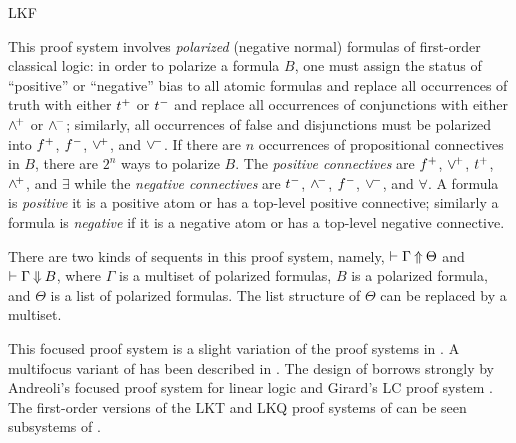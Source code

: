 \begin{entry}{LKF}
\begin{clarifications}
This proof system involves \emph{polarized} (negative normal) formulas
of first-order classical logic: in order to polarize a formula $B$,
one must assign the status of ``positive'' or ``negative'' bias to all
atomic formulas and replace all occurrences of truth with either
$t^+$ or $t^-$ and replace all occurrences of conjunctions with
either $\wedge^{\!+}$ or $\wedge^{\!-}$; similarly, all occurrences of false and
disjunctions must be polarized into $f^+$, $f^-$, $\vee^{\!+}$, and
$\vee^{\!-}$. If there are $n$ occurrences of propositional connectives
in $B$, there are $2^n$ ways to polarize $B$.
The \emph{positive connectives} are $f^+$, $\vee^{\!+}$, $t^+$,
$\wedge^{\!+}$, and $\exists$ while the \emph{negative connectives} are
$t^-$, $\wedge^{\!-}$, $f^-$, $\vee^{\!-}$, and $\forall$.
A formula is \emph{positive} it is a positive atom or has a top-level
positive connective; similarly a formula is \emph{negative} if it is a
negative atom or has a top-level negative connective.

There are two kinds of sequents in this proof system, namely,
$\vdash\Gamma\mathbin{\Uparrow} \Theta$ and $\vdash\Gamma\mathbin{\Downarrow} B$, where $\Gamma$ is a
multiset of polarized formulas, $B$ is a polarized formula, and
$\Theta$ is a list of polarized formulas.  The list structure of
$\Theta$ can be replaced by a multiset.
\end{clarifications}

\begin{history}
This focused proof system is a slight variation of the proof systems in
\cite{liang09tcs,liang07csl}.  
A multifocus variant of \LKF has been described in \cite{chaudhuri14jlc}.
The design of \LKF borrows strongly by Andreoli's focused proof system for
linear logic \cite{andreoli92jlc} and Girard's LC proof
system \cite{girard91mscs}.  The first-order versions 
of the LKT and LKQ proof systems of \cite{danos93wll} can be seen 
subsystems of \LKF.
\end{history}

\end{entry}
